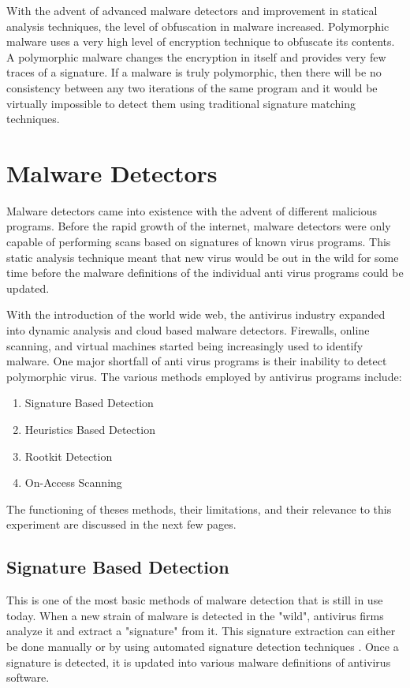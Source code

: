 With the advent of advanced malware detectors and improvement in statical analysis techniques, the level of obfuscation in malware increased. Polymorphic malware uses a very high level of encryption technique to obfuscate its contents. A polymorphic malware changes the encryption in itself and provides very few traces of a signature. If a malware is truly polymorphic, then there will be no consistency between any two iterations of the same program and it would be virtually impossible to detect them using traditional signature matching techniques.

\section{Malware Detectors}

Malware detectors came into existence with the advent of different malicious programs. Before the rapid growth of the internet, malware detectors were only capable of performing scans based on signatures of known virus programs. This static analysis technique meant that new virus would be out in the wild for some time before the malware definitions of the individual anti virus programs could be updated.

With the introduction of the world wide web, the antivirus industry expanded into dynamic analysis and cloud based malware detectors. Firewalls, online scanning, and virtual machines started being increasingly used to identify malware. One major shortfall of anti virus programs is their inability to detect polymorphic virus. The various methods employed by antivirus programs include:

\begin{enumerate}
	\item Signature Based Detection
	\item Heuristics Based Detection
	\item Rootkit Detection
	\item On-Access Scanning	
\end{enumerate}

The functioning of theses methods, their limitations, and their relevance to this experiment are discussed in the next few pages.

\subsection{Signature Based Detection}
	This is one of the most basic methods of malware detection that is still in use today. When a new strain of malware is detected in the "wild", antivirus firms analyze it and extract a "signature" from it. This signature extraction can either be done manually or by using automated signature detection techniques \cite{ask}. Once a signature is detected, it is updated into various malware definitions of antivirus software.
	
